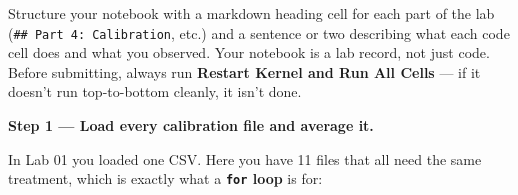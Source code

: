 \documentclass[
  12pt,
  letterpaper,
]{article}
\begin{document}
\begin{tcolorbox}[enhanced jigsaw, arc=.35mm, bottomrule=.15mm, bottomtitle=1mm, breakable, colback=white, colbacktitle=quarto-callout-tip-color!10!white, colframe=quarto-callout-tip-color-frame, coltitle=black, left=2mm, leftrule=.75mm, opacityback=0, opacitybacktitle=0.6, rightrule=.15mm, title=\textcolor{quarto-callout-tip-color}{\faLightbulb}\hspace{0.5em}{Good notebook habits}, titlerule=0mm, toprule=.15mm, toptitle=1mm]

Structure your notebook with a markdown heading cell for each part of
the lab (\texttt{\#\#\ Part\ 4:\ Calibration}, etc.) and a sentence or
two describing what each code cell does and what you observed. Your
notebook is a lab record, not just code. Before submitting, always run
\textbf{Restart Kernel and Run All Cells} --- if it doesn't run
top-to-bottom cleanly, it isn't done.

\end{tcolorbox}

\textbf{Step 1 --- Load every calibration file and average it.}

In Lab 01 you loaded one CSV. Here you have 11 files that all need the
same treatment, which is exactly what a \textbf{\texttt{for} loop} is
for:
\end{document}
